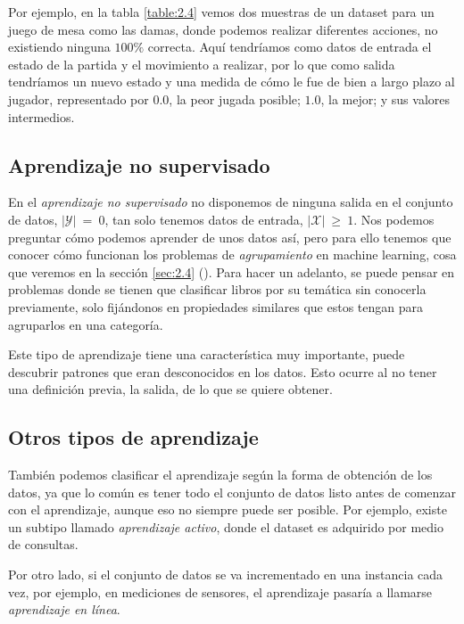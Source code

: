 Por ejemplo, en la tabla \ref{table:2.4} vemos dos muestras de un dataset para un juego de mesa como las damas, donde podemos realizar diferentes acciones, no existiendo ninguna $100\%$ correcta. Aquí tendríamos como datos de entrada el estado de la partida y el movimiento a realizar, por lo que como salida tendríamos un nuevo estado y una medida de cómo le fue de bien a largo plazo al jugador, representado por $0.0$, la peor jugada posible; $1.0$, la mejor; y sus valores intermedios.

\subsection{Aprendizaje no supervisado} \label{subsec:2.3.3}

En el \emph{aprendizaje no supervisado} no disponemos de ninguna salida en el conjunto de datos, $|\mathcal{Y}|\:=\:0$, tan solo tenemos datos de entrada, $|\mathcal{X}|\:\geq\:1$. Nos podemos preguntar cómo podemos aprender de unos datos así, pero para ello tenemos que conocer cómo funcionan los problemas de \emph{agrupamiento} en machine learning, cosa que veremos en la sección \ref{sec:2.4} (\emph{}). Para hacer un adelanto, se puede pensar en problemas donde se tienen que clasificar libros por su temática sin conocerla previamente, solo fijándonos en propiedades similares que estos tengan para agruparlos en una categoría.

Este tipo de aprendizaje tiene una característica muy importante, puede descubrir patrones que eran desconocidos en los datos. Esto ocurre al no tener una definición previa, la salida, de lo que se quiere obtener.

\subsection{Otros tipos de aprendizaje} \label{subsec:2.3.4}

También podemos clasificar el aprendizaje según la forma de obtención de los datos, ya que lo común es tener todo el conjunto de datos listo antes de comenzar con el aprendizaje, aunque eso no siempre puede ser posible. Por ejemplo, existe un subtipo llamado \emph{aprendizaje activo}, donde el dataset es adquirido por medio de consultas.

Por otro lado, si el conjunto de datos se va incrementado en una instancia cada vez, por ejemplo, en mediciones de sensores, el aprendizaje pasaría a llamarse \emph{aprendizaje en línea}.

